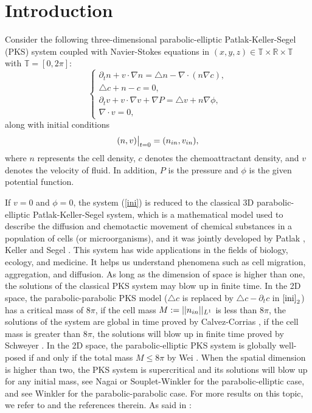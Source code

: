 \documentclass[12pt, reqno]{amsart}
\numberwithin{equation}{section}
\begin{document}
\section{Introduction}

Consider the following three-dimensional parabolic-elliptic Patlak-Keller-Segel (PKS) system coupled with Navier-Stokes equations in $(x,y,z)\in\mathbb{T}\times\mathbb{R}\times\mathbb{T}$ with $ \mathbb{T}=[0,2\pi] $:
\begin{equation}\label{ini}
	\left\{
	\begin{array}{lr}
		\partial_tn+v\cdot\nabla n=\triangle n-\nabla\cdot(n\nabla c), \\
		\triangle c+n-c=0, \\
		\partial_tv+v\cdot\nabla v+\nabla P=\triangle v+n\nabla\phi, \\
		\nabla\cdot v=0, 
	\end{array}
	\right.
\end{equation}
along with initial conditions
$$(n,v)\big|_{t=0}=(n_{\rm in},v_{\rm in}),$$
where $n$ represents the cell density, $c$ denotes the chemoattractant density, and $v$ denotes the velocity of fluid. In addition, $P$ is the pressure and $\phi$ is the given potential function.


If $v=0$ and $\phi=0$,  the system (\ref{ini}) is reduced to  the classical 3D parabolic-elliptic Patlak-Keller-Segel system, which is a mathematical model used to describe the diffusion and chemotactic movement of chemical substances in a population of cells (or microorganisms),
and it was jointly developed by Patlak \cite{Patlak1}, Keller and Segel \cite{Keller1}.
This system has wide applications in the fields of biology, ecology, and medicine. It helps us understand phenomena such as cell migration, aggregation, and diffusion. 
As long as the dimension of space is higher than one, the solutions of the classical PKS system may blow up in finite time.
In the 2D space, the parabolic-parabolic PKS model ($\triangle c$ is replaced by $\triangle c-\partial_tc$ in $\eqref{ini}_2$) has a critical mass of $8\pi$, if the cell mass $M:=||n_{\rm in}||_{L^1}$ is less than $8\pi$,  the solutions of the system are global in time proved by Calvez-Corrias \cite{Calvez1},
if the cell mass is greater than $8\pi$, the solutions will blow up in finite time proved by Schweyer \cite{Schweyer1}.
In the 2D space, the parabolic-elliptic PKS system is globally well-posed if and only if the total mass $M\leq8\pi$ by Wei \cite{wei11}.
When the spatial dimension is higher than two, the PKS system is supercritical and its solutions  will blow up for any initial mass, see Nagai \cite{Na2000} or Souplet-Winkler \cite{SW2019} for the parabolic-elliptic case, and see Winkler \cite{winkler1} for the parabolic-parabolic case.  For more results on this topic,  we refer to  \cite{BCM2008,DDDMW,TW2017} and the references therein. As said in \cite{zeng}:
\end{document}
